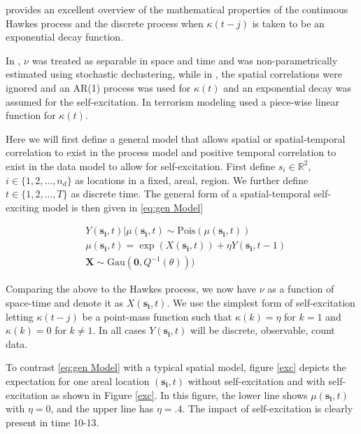 \documentclass[11pt]{isuthesis}
\begin{document}
\cite{laub2015hawkes} provides an excellent overview of the mathematical properties of the continuous Hawkes process and the discrete process when $\kappa (t-j)$ is taken to be an exponential decay function.

In \cite{mohler2011self}, $\nu$ was treated as separable in space and time and was non-parametrically estimated using stochastic declustering, while in \cite{mohler2013modeling}, the spatial correlations were ignored and an AR(1) process was used for $\kappa(t)$ and an exponential decay was assumed for the self-excitation.  In terrorism modeling \cite{lewis2012self} used a piece-wise linear function for $\kappa(t)$.  

Here we will first define a general model that allows spatial or spatial-temporal correlation to exist in the process model and positive temporal correlation to exist in the data model to allow for self-excitation.  First define $s_i \in \mathbb{R}^2$, $i \in \{1,2,...,n_d\}$ as locations in a fixed, areal, region. We further define $t \in \{1,2,...,T\}$ as discrete time. The general form of a spatial-temporal self-exciting model is then given in \eqref{eq:gen Model}

\begin{align}
& Y(\boldsymbol{s_i},t)|\mu(\boldsymbol{s_i},t) \sim \mbox{Pois}(\mu(\boldsymbol{s_i},t)) \label{eq:gen Model}\\
& \mu(\boldsymbol{s_i},t) = \exp(X(\boldsymbol{s_i},t)) + \eta Y(\boldsymbol{s_i},t-1) \nonumber \\
& \boldsymbol{X} \sim \mbox{Gau}(\boldsymbol{0},Q^{-1}(\theta))) \nonumber
\end{align}

Comparing the above to the Hawkes process, we now have $\nu$ as a function of space-time and denote it as $X(\boldsymbol{s_i},t)$.  We use the simplest form of self-excitation letting $\kappa(t-j)$ be a point-mass function such that $\kappa(k)=\eta$ for $k=1$ and $\kappa(k)=0$ for $k \neq 1$.  In all cases $Y(\boldsymbol{s_i},t)$ will be discrete, observable, count data.  

To contrast \eqref{eq:gen Model} with a typical spatial model, figure \ref{exc} depicts the expectation for one areal location $(\boldsymbol{s_i},t)$ without self-excitation and with self-excitation as shown in Figure \ref{exc}. In this figure, the lower line shows $\mu(\boldsymbol{s_i},t)$ with $\eta=0$, and the upper line has $\eta=.4$.  The impact of self-excitation is clearly present in time 10-13.
\end{document}
